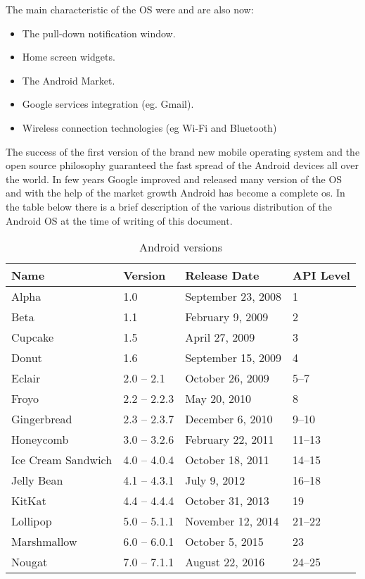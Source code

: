 The main characteristic of the OS were and are also now:
\begin{itemize}
	\item The pull-down notification window.
	\item Home screen widgets.
	\item The Android Market.
	\item Google services integration (eg. Gmail).
	\item Wireless connection technologies (eg Wi-Fi and Bluetooth)
\end{itemize}
The success of the first version of the brand new mobile operating system and the open source philosophy guaranteed the fast spread of the Android devices all over the world. In few years Google improved and released many version of the OS and with the help of the market growth Android has become a complete os. 
In the table below there is a brief description of the various distribution of the Android OS at the time of writing of this document.\\
\begin{table}[h]
	\caption{Android versions}
	\label{tab:vers}
	\centering
	\begin{tabular}{llll}
		\toprule
		\textbf{Name} & \textbf{Version}  & \textbf{Release Date} & \textbf{API Level}\\
		\midrule
		Alpha &	1.0 & September 23, 2008 & 1 \\
		Beta & 1.1 & February 9, 2009 & 2 \\
		Cupcake & 1.5 & April 27, 2009 & 3 \\
		Donut &	1.6 & September 15, 2009 & 4 \\
		Eclair & 2.0 – 2.1 & October 26, 2009 & 5–7 \\
		Froyo & 2.2 – 2.2.3 & May 20, 2010 & 8 \\
		Gingerbread & 2.3 – 2.3.7 & December 6, 2010 & 9–10 \\	
		Honeycomb & 3.0 – 3.2.6 & February 22, 2011 & 11–13 \\
		Ice Cream Sandwich & 4.0 – 4.0.4 & October 18, 2011 & 14–15 \\
		Jelly Bean & 4.1 – 4.3.1 & July 9, 2012 & 16–18 \\
		KitKat & 4.4 – 4.4.4 & October 31, 2013 & 19 \\
		Lollipop & 5.0 – 5.1.1 & November 12, 2014 & 21–22 \\
		Marshmallow & 6.0 – 6.0.1 & October 5, 2015 & 23 \\
		Nougat & 7.0 – 7.1.1 & August 22, 2016 & 24–25 \\
		\bottomrule
	\end{tabular}
\end{table}
